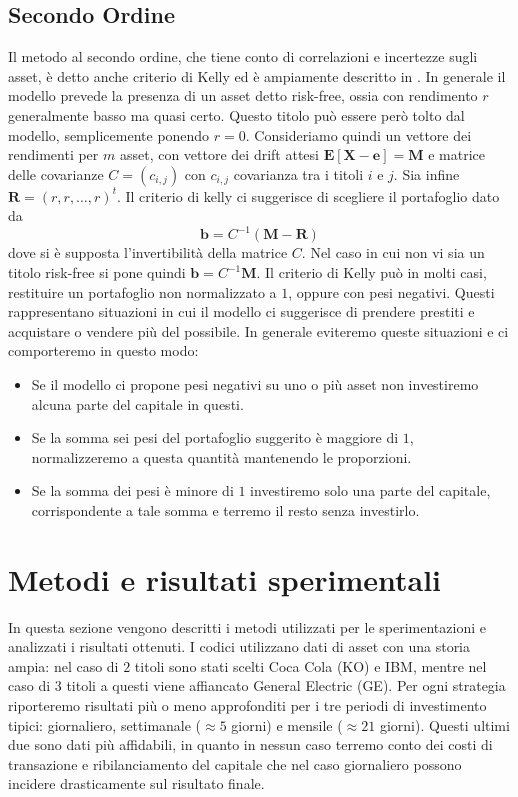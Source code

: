 \documentclass[a4paper,11pt]{book}
\theoremstyle{plain}
\theoremstyle{definition}
\theoremstyle{remark}
\newcommand{\X}{\bm{X}}
\newcommand{\B}{\bm{b}}
\newcommand{\E}{\mathbf{E}}
\begin{document}
\subsection{Secondo Ordine}
Il metodo al secondo ordine, che tiene conto di correlazioni e incertezze sugli asset, è detto anche criterio di Kelly ed è ampiamente descritto in \cite{ThorpKelly}.\newline
In generale il modello prevede la presenza di un asset detto risk-free, ossia con rendimento $r$ generalmente basso ma quasi certo. Questo titolo può essere però tolto dal modello, semplicemente ponendo $r=0$. Consideriamo quindi un vettore dei rendimenti per $m$ asset, con vettore dei drift attesi $\E[\X-\bm{e}]=\bm{M}$ e matrice delle covarianze $C =(c_{i,j})$ con $c_{i,j}$ covarianza tra i titoli $i$ e $j$. Sia infine $\bm{R}=(r,r,\ldots,r)^t$.\newline
Il criterio di kelly ci suggerisce di scegliere il portafoglio dato da
\begin{equation*}
	\B=C^{-1}(\bm{M}-\bm{R})
\end{equation*}
dove si è supposta l'invertibilità della matrice $C$. Nel caso in cui non vi sia un titolo risk-free si pone quindi $\B=C^{-1}\bm{M}$.\newline
Il criterio di Kelly può in molti casi, restituire un portafoglio non normalizzato a $1$, oppure con pesi negativi. Questi rappresentano situazioni in cui il modello ci suggerisce di prendere prestiti e acquistare o vendere più del possibile.\newline
In generale eviteremo queste situazioni e ci comporteremo in questo modo:
\begin{itemize}
	\item Se il modello ci propone pesi negativi su uno o più asset non investiremo alcuna parte del capitale in questi.
	\item Se la somma sei pesi del portafoglio suggerito è maggiore di $1$, normalizzeremo a questa quantità mantenendo le proporzioni.
	\item Se la somma dei pesi è minore di $1$ investiremo solo una parte del capitale, corrispondente a tale somma e terremo il resto senza investirlo.
\end{itemize}
\section{Metodi e risultati sperimentali}
In questa sezione vengono descritti i metodi utilizzati per le sperimentazioni e analizzati i risultati ottenuti. I codici utilizzano dati di asset con una storia ampia: nel caso di $2$ titoli sono stati scelti Coca Cola (KO) e IBM, mentre nel caso di $3$ titoli a questi viene affiancato General Electric (GE). Per ogni strategia riporteremo risultati più o meno approfonditi per i tre periodi di investimento tipici: giornaliero, settimanale ($\approx 5$ giorni) e mensile ($\approx 21$ giorni). Questi ultimi due sono dati più affidabili, in quanto in nessun caso terremo conto dei costi di transazione e ribilanciamento del capitale che nel caso giornaliero possono incidere drasticamente sul risultato finale.
\end{document}
